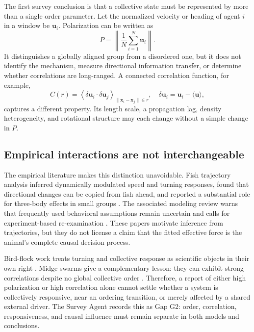 \documentclass[conference]{../../../../Conference-LaTeX-template_10-17-19/IEEEtran}
\begin{document}
The first survey conclusion is that a collective state must be represented by more than a single order parameter. Let the normalized velocity or heading of agent $i$ in a window be $\mathbf{u}_i$. Polarization can be written as
\begin{equation}
P=\left\|\frac{1}{N}\sum_{i=1}^{N}\mathbf{u}_i\right\|.
\end{equation}
It distinguishes a globally aligned group from a disordered one, but it does not identify the mechanism, measure directional information transfer, or determine whether correlations are long-ranged. A connected correlation function, for example,
\begin{equation}
C(r)=\left\langle\delta\mathbf{u}_i\cdot\delta\mathbf{u}_j\right\rangle_{\|\mathbf{x}_i-\mathbf{x}_j\|\in r},
\quad \delta\mathbf{u}_i=\mathbf{u}_i-\langle\mathbf{u}\rangle,
\end{equation}
captures a different property. Its length scale, a propagation lag, density heterogeneity, and rotational structure may each change without a simple change in $P$.

\subsection{Empirical interactions are not interchangeable}
The empirical literature makes this distinction unavoidable. Fish trajectory analysis inferred dynamically modulated speed and turning responses, found that directional changes can be copied from fish ahead, and reported a substantial role for three-body effects in small groups \cite{katz}. The associated modeling review warns that frequently used behavioral assumptions remain uncertain and calls for experiment-based re-examination \cite{lopez}. These papers motivate inference from trajectories, but they do not license a claim that the fitted effective force is the animal's complete causal decision process.

Bird-flock work treats turning and collective response as scientific objects in their own right \cite{cavagnaBird,cavagnaTurn}. Midge swarms give a complementary lesson: they can exhibit strong correlations despite no global collective order \cite{attanasi}. Therefore, a report of either high polarization or high correlation alone cannot settle whether a system is collectively responsive, near an ordering transition, or merely affected by a shared external driver. The Survey Agent records this as Gap G2: order, correlation, responsiveness, and causal influence must remain separate in both models and conclusions.
\end{document}
